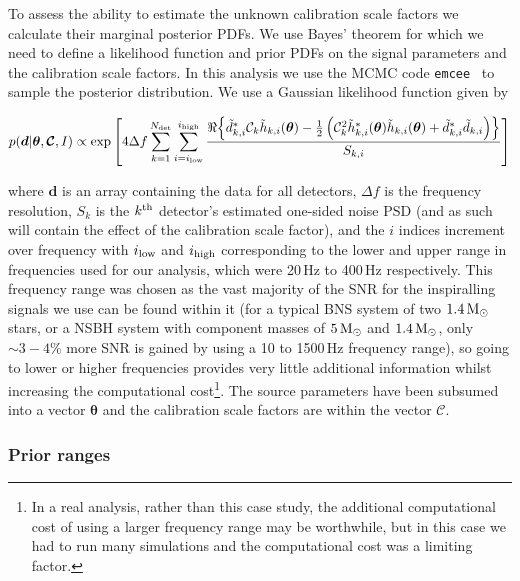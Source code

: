 \documentclass[prd, twocolumn, lengthcheck, superscriptaddress, showpacs, letterpaper, nofootinbib]{revtex4-1}
\newcommand{\gws}{\tilde{h}}
\newcommand{\scf}{\ensuremath{\mathcal{C}}}
\newcommand{\btheta}{\bm{\theta}}
\begin{document}
To assess the ability to estimate the unknown calibration scale factors we
calculate their marginal posterior \acp{PDF}.  We use Bayes' theorem for which
we need to define a likelihood function and prior \acp{PDF} on the signal
parameters and the calibration scale factors. In this analysis we use the
\ac{MCMC} code {\tt emcee}~\cite{2013PASP..125..306F} to sample
the posterior distribution. We use a Gaussian likelihood function given by
%
\begin{widetext}
\begin{equation}
p(\bm{d} | \btheta, \bm{\scf}, I) \propto \exp{\left[4\Delta f \sum_{k=1}^{N_{\rm 
det}}
  \sum_{i=i_{\rm low}}^{i_{\rm high}}\frac{\Re{\left\{ \tilde{d}^{*}_{k,i} 
\scf_{k}\gws_{k,i}(\btheta) - \frac{1}{2}\left(\scf_k^2 \gws^*_{k,i}(\btheta)\gws_{k,i}(\btheta) + 
\tilde{d}^*_{k,i}\tilde{d}_{k,i}\right) \right\}}}{S_{k,i}}\right]}
\end{equation}
\end{widetext}
%
where $\bm{d}$ is an array containing the data for all detectors, $\Delta f$ is
the frequency resolution, $S_k$ is the $k^{\rm th}$ detector's estimated
one-sided noise \ac{PSD} (and as such will contain the effect of the
calibration scale factor), and the $i$ indices increment over frequency with
$i_{\rm low}$ and $i_{\rm high}$ corresponding to the lower and upper range in
frequencies used for our analysis, which were 20\,Hz to 400\,Hz respectively.
This frequency range was chosen as the vast majority of the \ac{SNR} for the
inspiralling signals we use can be found within it (for a typical \ac{BNS}
system of two $1.4\,{\rm M_{\odot}}$ stars, or a \ac{NSBH} system with component masses of
$5\,{\rm M_{\odot}}$ and $1.4\,{\rm M_{\odot}}$, only $\sim 3-4\%$ more \ac{SNR} is gained
by using a 10 to 1500\,Hz frequency range), so going to lower
or higher frequencies provides very little additional information whilst increasing
the computational cost\footnote{In a real analysis, rather than this case study, the additional
computational cost of using a larger frequency range may be worthwhile, but in this case we had
to run many simulations and the computational cost was a limiting factor.}. The source
parameters have been subsumed into a vector $\btheta$ and the calibration scale
factors are within the vector $\bm{\scf}$.

\subsubsection{Prior ranges}\label{sec:priors}
\end{document}
